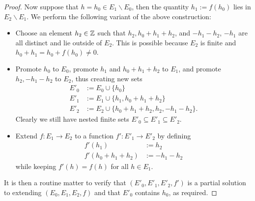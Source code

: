 \begin{proof}
Now suppose that $h = h_0 \in E_1 \backslash E_0$, then the quantity $h_1 := f(h_0)$ lies in $E_2 \backslash E_1$.  We perform the following variant of the above construction:
\begin{itemize}
\item Choose an element $h_2 \in \mathbb{Z}$ such that $h_2, h_0+h_1+h_2$, and $-h_1-h_2$, $-h_1$ are all distinct and lie outside of $E_2$.  This is possible because $E_2$ is finite and $h_0+h_1 = h_0+f(h_0) \neq 0$.
\item Promote $h_0$ to $E_0$, promote $h_1$ and $h_0+h_1+h_2$ to $E_1$, and promote $h_2, -h_1-h_2$ to $E_2$, thus creating new sets
\begin{align*}
  E'_0 &:= E_0 \cup \{h_0\} \\
  E'_1 &:= E_1 \cup \{h_1, h_0+h_1+h_2\} \\
  E'_2 &:= E_2 \cup \{h_0+h_1+h_2, h_2, -h_1-h_2\}.
\end{align*}
Clearly we still have nested finite sets $E'_0 \subseteq E'_1 \subseteq E'_2$.
\item Extend $f : E_1 \to E_2$ to a function $f': E'_1 \to E'_2$ by defining
\begin{align*}
  f'(h_1) &:= h_2 \\
  f'(h_0+h_1+h_2) &:= -h_1-h_2
\end{align*}
while keeping $f'(h)=f(h)$ for all $h \in E_1$.
\end{itemize}
It is then a routine matter to verify that $(E'_0,E'_1,E'_2,f')$ is a partial solution to  extending $(E_0,E_1,E_2,f)$ and that $E'_0$ contains $h_0$, as required.


\end{proof}
